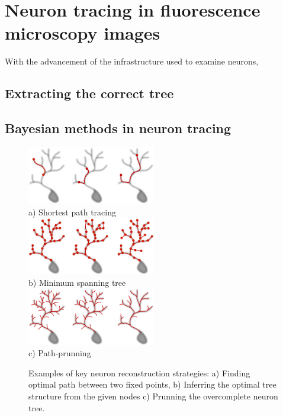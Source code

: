 \section{Neuron tracing in fluorescence microscopy images}
With the advancement of the infrastructure used to examine neurons,   

\subsection{Extracting the correct tree}

\subsection{Bayesian methods in neuron tracing}

\begin{figure}
\begin{center}
\includegraphics[width=0.5\textwidth]{ch1_fig2}\\
a) Shortest path tracing \\
\includegraphics[width=0.5\textwidth]{ch1_fig3}\\
b) Minimum spanning tree \\
\includegraphics[width=0.5\textwidth]{ch1_fig4}\\
c) Path-prunning
\end{center}
\vspace{-3ex}
\caption{Examples of key neuron reconstruction strategies: a) Finding optimal path between two fixed points, b) Inferring the  optimal tree structure from the given nodes c) Prunning the overcomplete neuron tree.}
\vspace{-1ex}
\label{ch1__fig2-4}
\end{figure}

